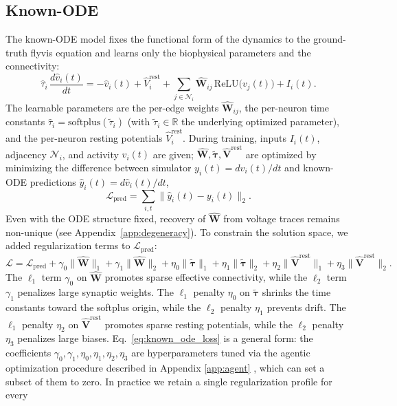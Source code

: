 \documentclass{article}
\begin{document}
\subsection{Known-ODE} \label{app:known_ode}
The known-ODE model fixes the functional form of the dynamics to the ground-truth flyvis equation and learns only the biophysical parameters and the connectivity:
\begin{equation}
\hat{\tau}_i\,\frac{d\hat{v}_i(t)}{dt}
= -\hat{v}_i(t) + \hat{V}^{\mathrm{rest}}_i
+ \sum_{j\in\mathcal{N}_i} \hat{\mathbf{W}}_{ij}\,\mathrm{ReLU}\!\big(v_j(t)\big)
+ I_i(t).
\label{eq:known_ode}
\end{equation}
The learnable parameters are the per-edge weights $\hat{\mathbf{W}}_{ij}$, the per-neuron time constants $\hat{\tau}_i = \mathrm{softplus}(\tilde{\tau}_i)$ (with $\tilde{\tau}_i\in\mathbb{R}$ the underlying optimized parameter), and the per-neuron resting potentials $\hat{V}^{\mathrm{rest}}_i$. During training, inputs $I_i(t)$, adjacency $\mathcal{N}_i$, and activity $v_i(t)$ are given; $\hat{\mathbf{W}}, \tilde{\boldsymbol{\tau}}, \hat{\mathbf{V}}^{\mathrm{rest}}$ are optimized by minimizing the difference between simulator $y_i(t)=dv_i(t)/dt$ and known-ODE predictions $\hat{y}_i(t)=d\hat{v}_i(t)/dt$,
\begin{equation}
\mathcal{L}_{\mathrm{pred}} = \sum_{i,t}\|\hat{y}_i(t) - y_i(t)\|_2.
\label{eq:known_ode_loss_pred}
\end{equation}
Even with the ODE structure fixed, recovery of $\hat{\mathbf{W}}$ from voltage traces remains non-unique (see Appendix~\ref{app:degeneracy}). To constrain the solution space, we added regularization terms to $\mathcal{L}_{\mathrm{pred}}$:
\begin{equation}
\mathcal{L} = \mathcal{L}_{\mathrm{pred}}
+ \gamma_0\|\hat{\mathbf{W}}\|_1 + \gamma_1\|\hat{\mathbf{W}}\|_2
+ \eta_0\|\tilde{\boldsymbol{\tau}}\|_1 + \eta_1\|\tilde{\boldsymbol{\tau}}\|_2
+ \eta_2\|\hat{\mathbf{V}}^{\mathrm{rest}}\|_1 + \eta_3\|\hat{\mathbf{V}}^{\mathrm{rest}}\|_2.
\label{eq:known_ode_loss}
\end{equation}
The $\ell_1$ term $\gamma_0$ on $\hat{\mathbf{W}}$ promotes sparse effective connectivity, while the $\ell_2$ term $\gamma_1$ penalizes large synaptic weights. The $\ell_1$ penalty $\eta_0$ on $\tilde{\boldsymbol{\tau}}$ shrinks the time constants toward the softplus origin, while the $\ell_2$ penalty $\eta_1$ prevents drift. The $\ell_1$ penalty $\eta_2$ on $\hat{\mathbf{V}}^{\mathrm{rest}}$ promotes sparse resting potentials, while the $\ell_2$ penalty $\eta_3$ penalizes large biases. Eq.~\ref{eq:known_ode_loss} is a general form: the coefficients $\gamma_0,\gamma_1,\eta_0,\eta_1,\eta_2,\eta_3$ are hyperparameters tuned via the agentic optimization procedure described in Appendix \ref{app:agent} , which can set a subset of them to zero. In practice we retain a single regularization profile for every
\end{document}
